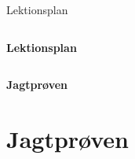 \begin{frame}{Lektionsplan}
  \vspace{1em}
  \begin{columns}[T]

    \setlength{\parskip}{0.4em}
    \small
    \RaggedRight

    \textbf{Lektionsplan}

  \end{columns}
\end{frame}


\begin{frame}
  \vspace{3em}
  \begin{center}
    {\LARGE \textbf{Jagtprøven}}
  \end{center}
\end{frame}



\section{Jagtprøven}

